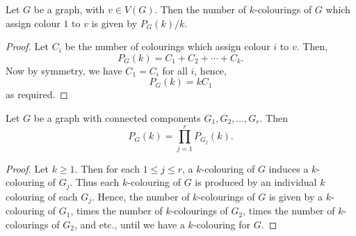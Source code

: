 \documentclass{unswmaths}
\begin{document}
\begin{lemma}[Part (b)]
\label{3b}
    Let $G$ be a graph, with $v \in V(G)$. Then the number of $k$-colourings
    of $G$ which assign colour $1$ to $v$ is given by $P_G(k)/k$.
\end{lemma}
\begin{proof}
    Let $C_i$ be the number of colourings which assign colour $i$ to $v$. 
    Then, 
    \begin{equation*}
        P_G(k) = C_1+C_2+\cdots+C_k.
    \end{equation*}
    Now by symmetry, we have $C_1 = C_i$ for all $i$, hence,
    \begin{equation*}
        P_G(k) = kC_1
    \end{equation*}
    as required.
\end{proof}

\begin{lemma}[Part (c)]
\label{3c}
    Let $G$ be a graph with connected components $G_1,G_2,\ldots,G_r$.
    Then 
    \begin{equation*}
        P_G(k) = \prod_{j=1}^r P_{G_j}(k).
    \end{equation*}
\end{lemma}
\begin{proof}
    Let $k \geq 1$. Then for each $1 \leq j \leq r$, a $k$-colouring
    of $G$ induces a $k$-colouring of $G_j$. Thus each $k$-colouring
    of $G$ is produced by an individual $k$ colouring of each $G_j$. 
    Hence, the number of $k$-colourings of $G$ is given by a $k$-colouring
    of $G_1$, times the number of $k$-colourings of $G_2$, times 
    the number of $k$-colourings of $G_2$, and etc., until we have
    a $k$-colouring for $G$.
\end{proof}
\end{document}
